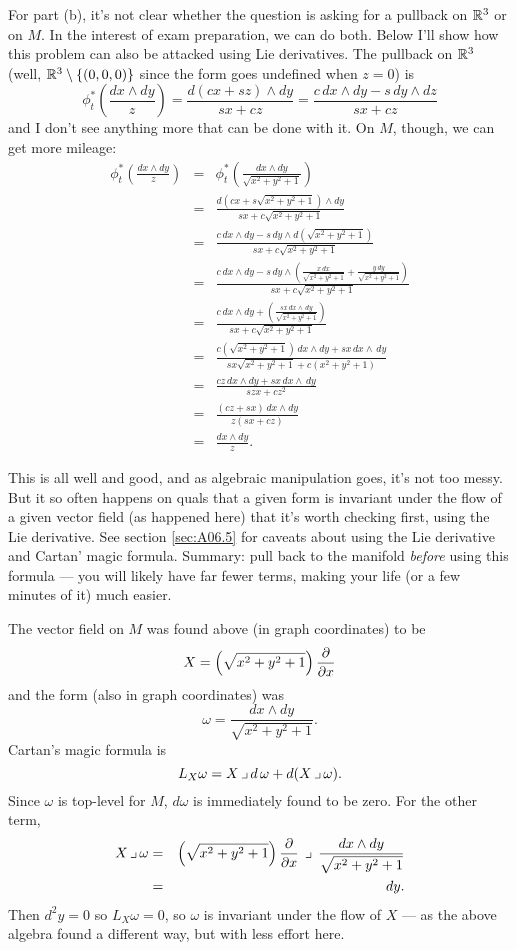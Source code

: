\documentclass[10pt]{article}
\numberwithin{equation}{subsection}
\begin{document}
For part (b), it's not clear whether the question is asking for a pullback on
$\mathbb{R}^3$ or on $M$.  In the interest of exam preparation, we can do both.  Below
I'll show how this problem can also be attacked using Lie derivatives.  The
pullback on $\mathbb{R}^3$ (well, $\mathbb{R}^3 \setminus \{(0,0,0)\}$ since the form goes
undefined when $z=0$) is
$$
	\phi_t^*\left(\frac{dx \wedge dy}{z}\right)
	= \frac{d(cx+sz) \wedge dy}{sx+cz}
	= \frac{c\,dx\wedge dy - s\,dy\wedge dz}{sx+cz}
$$
and I don't see anything more that can be done with it.  On $M$, though, we can
get more mileage:
\begin{eqnarray*}
	\phi_t^*\left(\frac{dx \wedge dy}{z}\right)
	&=& \phi_t^*\left(\frac{dx \wedge dy}{\sqrt{x^2+y^2+1}}\right) \\
	&=& \frac{d\left(cx+s\sqrt{x^2+y^2+1}\right)
		\wedge dy}{sx+c\sqrt{x^2+y^2+1}} \\
	&=& \frac{c\,dx\wedge dy - s\,dy\wedge d\left(\sqrt{x^2+y^2+1}\right)}
		{sx+c\sqrt{x^2+y^2+1}} \\
	&=& \frac{c\,dx\wedge dy - s\,dy\wedge
		\left(
		\frac{x\,dx}{\sqrt{x^2+y^2+1}}+ \frac{y\,dy}{\sqrt{x^2+y^2+1}}
		\right)
		}
		{sx+c\sqrt{x^2+y^2+1}} \\
	&=& \frac{c\,dx\wedge dy +
		\left(
		\frac{sx\,dx \wedge \,dy}{\sqrt{x^2+y^2+1}}
		\right)
		}
		{sx+c\sqrt{x^2+y^2+1}} \\
	&=& \frac{c(\sqrt{x^2+y^2+1})\,dx\wedge dy + sx\,dx \wedge \,dy}
		{sx\sqrt{x^2+y^2+1}+c(x^2+y^2+1)} \\
	&=& \frac{cz\,dx\wedge dy + sx\,dx \wedge \,dy}
		{szx+cz^2} \\
	&=& \frac{(cz + sx) \,dx\wedge dy}
		{z(sx+cz)} \\
	&=& \frac{dx \wedge dy}{z}.
\end{eqnarray*}

This is all well and good, and as algebraic manipulation goes, it's not too
messy.  But it so often happens on quals that a given form is invariant under
the flow of a given vector field (as happened here) that it's worth checking
first, using the Lie derivative.  See section \ref{sec:A06.5} for caveats about
using the Lie derivative and Cartan' magic formula.  Summary:  pull back to the
manifold \emph{before} using this formula --- you will likely have far fewer
terms, making your life (or a few minutes of it) much easier.

The vector field on $M$ was found above (in graph coordinates) to be
$$
	X = \left(\sqrt{x^2+y^2+1}\right) \frac{\partial}{\partial x}
$$
and the form (also in graph coordinates) was
$$
	\omega = \frac{dx\wedge dy}{\sqrt{x^2+y^2+1}}.
$$
Cartan's magic formula is
$$
	L_X\omega = X\,\lrcorner\, d\,\omega + d(X\,\lrcorner\,\omega).
$$
Since $\omega$ is top-level for $M$, $d\omega$ is immediately found to be
zero.  For the other term,
\begin{eqnarray*}
	X \,\lrcorner\, \omega &=&
		\left(\sqrt{x^2+y^2+1}\right) \frac{\partial}{\partial x} \;\,\lrcorner\,\;
		\frac{dx\wedge dy}{\sqrt{x^2+y^2+1}} \\
	&=& dy.
\end{eqnarray*}
Then $d^2y =0$ so $L_X\omega=0$, so $\omega$ is invariant under the flow of $X$
--- as the above algebra found a different way, but with less effort
here.
\end{document}
